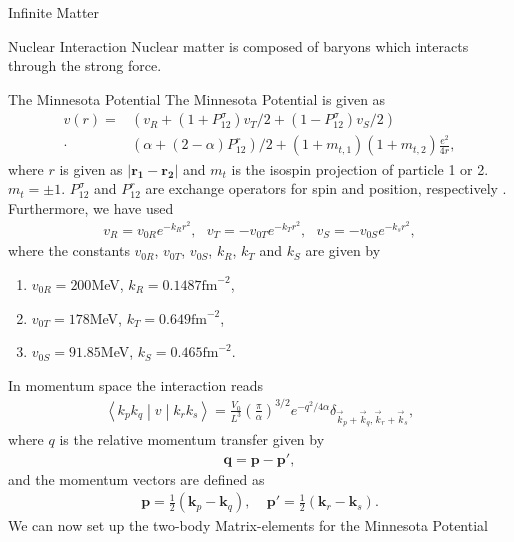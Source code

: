 \documentclass[twoside,english]{uiofysmaster}
\begin{document}
\begin{chapter}{Infinite Matter}
	\begin{section}{Nuclear Interaction}
		Nuclear matter is composed of baryons which interacts through the strong force. 
		
		\begin{subsection}{The Minnesota Potential}
			The Minnesota Potential is given as
			\begin{align}
				v(r) = &\left(v_R + (1 + P_{12}^\sigma) v_T/2 + (1 - P_{12}^\sigma) v_S/2 \right) \\
					   \cdot &\left( \alpha + (2- \alpha)P_{12}^r \right)/2 + (1+m_{t,1})(1+m_{t,2})\frac{e^2}{4r}, \nonumber
			\end{align}
			where $r$ is given as $\left| \mathbf{r_1} - \mathbf{r_2} \right|$ and $m_t$ is the isospin projection of particle 1 or 2. $m_t = \pm 1$. 
			$P_{12}^\sigma $ and $P_{12}^r$ are exchange operators for spin and position, respectively \cite{Baardsen}. Furthermore, we have used
			\begin{align} 
				v_R = v_{0R}e^{-k_R r^2}, \:\:\: v_T = -v_{0T} e^{-k_Tr^2}, \:\:\: v_S = -v_{0S}e^{-k_sr^2},
			\end{align}
			where the constants $v_{0R}$, $v_{0T}$, $v_{0S}$, $k_R$, $k_T$ and $k_S$ are given by \cite{Thompson1977}
			\begin{enumerate}
				\item $v_{0R} = 200$MeV,  $k_R = 0.1487 \text{fm}^{-2}$,
				\item $v_{0T} = 178$MeV,  $k_T = 0.649 \text{fm}^{-2}$,
				\item $v_{0S} = 91.85$MeV, $k_S = 0.465 \text{fm}^{-2}$.
			\end{enumerate}
In momentum space the interaction reads
			\begin{align}
			 	\left<k_p k_q \middle| v \middle| k_r k_s \right> = \frac{V_0}{L^3} \left(\frac{\pi}{\alpha}\right)^{3/2} e^{-q^2 / 4 \alpha} \delta_{\vec k_p + \vec k_q, \vec k_r + \vec k_s},
			\end{align}
			where $q$ is the relative momentum transfer given by 
			\begin{align}
				\mathbf{q} = \mathbf{p} - \mathbf{p'},
			\end{align}
			and the momentum vectors are defined as
			\begin{align}
				\mathbf{p} = \frac{1}{2} (\mathbf{k}_p - \mathbf{k}_q), \:\:\:\:\: \mathbf{p'} = \frac{1}{2}(\mathbf{k}_r- \mathbf{k}_s).
			\end{align}
			We can now set up the two-body Matrix-elements for the Minnesota Potential

\end{subsection}
\end{section}
\end{chapter}
\end{document}
